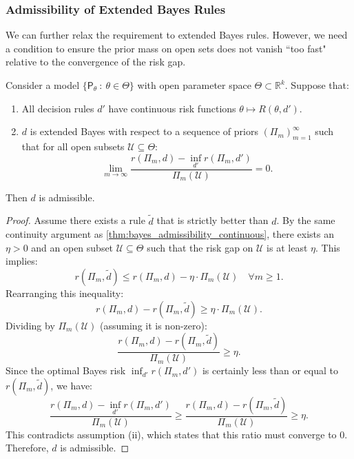 \subsubsection{Admissibility of Extended Bayes Rules}

We can further relax the requirement to extended Bayes rules. However, we need a condition to ensure the prior mass on open sets does not vanish ``too fast" relative to the convergence of the risk gap.

\begin{theo}
\label{thm:extended_bayes_admissibility}
Consider a model \(\{\mathsf{P}_{\theta} \: : \: \theta\in \Theta\} \) with open parameter space \(\Theta \subset \mathbb{R}^k\). Suppose that:
\begin{enumerate}
    \item[(i)] All decision rules \(d'\) have continuous risk functions \(\theta \mapsto R(\theta,d') \).
    \item[(ii)] \(d\) is extended Bayes with respect to a sequence of priors \((\Pi_m)_{m=1}^{\infty}\) such that for all open subsets \(\mathcal{U} \subseteq \Theta\):
    \[ \lim_{m \to \infty} \frac{r(\Pi_m, d) - \inf_{d'} r(\Pi_m, d')}{\Pi_m(\mathcal{U})} = 0. \]
\end{enumerate}
Then \(d\) is admissible.
\end{theo}

\begin{proof}
Assume there exists a rule \(\tilde{d}\) that is strictly better than \(d\).
By the same continuity argument as \autoref{thm:bayes_admissibility_continuous}, there exists an \(\eta > 0\) and an open subset \(\mathcal{U} \subseteq \Theta\) such that the risk gap on \(\mathcal{U}\) is at least \(\eta\). This implies:
\[ r(\Pi_m, \tilde{d}) \le r(\Pi_m, d) - \eta \cdot \Pi_m(\mathcal{U}) \quad \forall m \ge 1. \]
Rearranging this inequality:
\[ r(\Pi_m, d) - r(\Pi_m, \tilde{d}) \ge \eta \cdot \Pi_m(\mathcal{U}). \]
Dividing by \(\Pi_m(\mathcal{U})\) (assuming it is non-zero):
\[ \frac{r(\Pi_m, d) - r(\Pi_m, \tilde{d})}{\Pi_m(\mathcal{U})} \ge \eta. \]
Since the optimal Bayes risk \(\inf_{d'} r(\Pi_m, d')\) is certainly less than or equal to \(r(\Pi_m, \tilde{d})\), we have:
\[ \frac{r(\Pi_m, d) - \inf_{d'} r(\Pi_m, d')}{\Pi_m(\mathcal{U})} \ge \frac{r(\Pi_m, d) - r(\Pi_m, \tilde{d})}{\Pi_m(\mathcal{U})} \ge \eta. \]
This contradicts assumption (ii), which states that this ratio must converge to 0. Therefore, \(d\) is admissible.
\end{proof}

